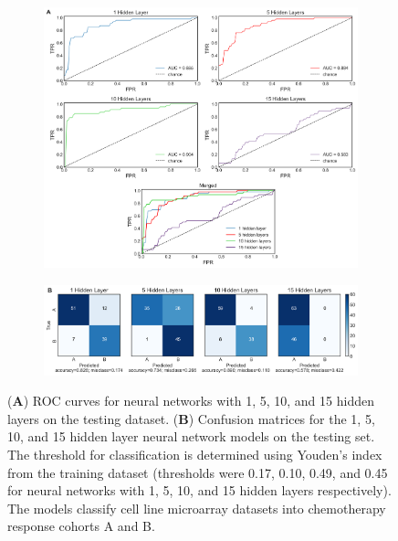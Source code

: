 \documentclass[10pt, letterpaper, twocolumn]{article}
\begin{document}
\begin{figure}[!ht]
    \centering
    \begin{subfigure}[t]{\textwidth}
		\centering
		\includegraphics[width=\textwidth]{Figures/roc/final_roc.png}
	\end{subfigure}

    \begin{subfigure}[t]{\textwidth}
        \centering
        \includegraphics[width=\textwidth]{Figures/confusion_matrix/fcm_combined.png}
    \end{subfigure}

    \caption{(\textbf{A}) ROC curves for neural networks with 1, 5, 10, and 15 hidden layers on the testing dataset. (\textbf{B}) Confusion matrices for the 1, 5, 10, and 15 hidden layer neural network models on the testing set. The threshold for classification is determined using Youden's index from the training dataset (thresholds were 0.17, 0.10, 0.49, and 0.45 for neural networks with 1, 5, 10, and 15 hidden layers respectively). The models classify cell line microarray datasets into chemotherapy response cohorts A and B.}
    \label{fig:nnet}
\end{figure}
\end{document}
